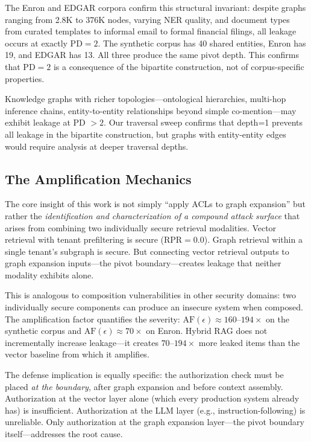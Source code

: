 \documentclass[letterpaper,twocolumn,10pt]{article}
\begin{document}
The Enron and EDGAR corpora confirm this structural invariant: despite
graphs ranging from 2.8K to 376K nodes, varying NER quality, and
document types from curated templates to informal email to formal
financial filings, all leakage occurs at exactly $\text{PD} = 2$. The
synthetic corpus has 40 shared entities, Enron has 19, and EDGAR has 13.
All three produce the same pivot depth. This confirms that
$\text{PD} = 2$ is a consequence of the bipartite construction, not
of corpus-specific properties.

Knowledge graphs with richer topologies---ontological hierarchies,
multi-hop inference chains, entity-to-entity relationships beyond
simple co-mention---may exhibit leakage at PD $> 2$. Our traversal
sweep confirms that depth=1 prevents all leakage in the bipartite
construction, but graphs with entity-entity edges would require
analysis at deeper traversal depths.

\subsection{The Amplification Mechanics}

The core insight of this work is not simply ``apply ACLs to graph
expansion'' but rather the \emph{identification and characterization
of a compound attack surface} that arises from combining two
individually secure retrieval modalities. Vector retrieval with
tenant prefiltering is secure ($\text{RPR} = 0.0$). Graph retrieval
within a single tenant's subgraph is secure. But connecting
vector retrieval outputs to graph expansion inputs---the pivot
boundary---creates leakage that neither modality exhibits alone.

This is analogous to composition vulnerabilities in other
security domains: two individually secure components can produce
an insecure system when composed. The amplification factor quantifies
the severity: $\text{AF}(\epsilon) \approx 160\text{--}194\times$ on
the synthetic corpus and $\text{AF}(\epsilon) \approx 70\times$ on
Enron. Hybrid RAG does not incrementally increase leakage---it
creates $70$--$194\times$ more leaked items than the vector baseline
from which it amplifies.

The defense implication is equally specific: the authorization
check must be placed \emph{at the boundary}, after graph expansion
and before context assembly. Authorization at the vector layer
alone (which every production system already has) is insufficient.
Authorization at the LLM layer (e.g., instruction-following) is
unreliable. Only authorization at the graph expansion layer---the
pivot boundary itself---addresses the root cause.
\end{document}
